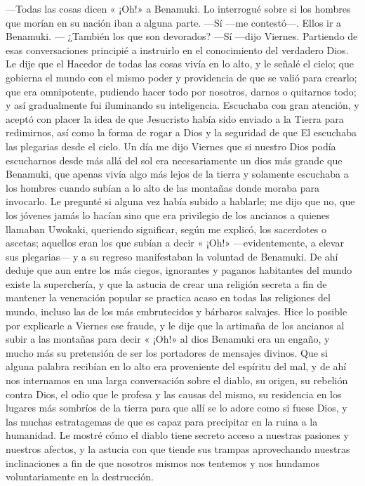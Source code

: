 \documentclass{novela}
\begin{document}
    —Todas las cosas dicen « ¡Oh!» a Benamuki.
    Lo interrogué sobre si los hombres que morían en su nación iban a alguna parte.
    —Sí —me contestó—. Ellos ir a Benamuki.
    — ¿También los que son devorados?
    —Sí —dijo Viernes.
    Partiendo de esas conversaciones principié a instruirlo en el conocimiento del verdadero Dios. Le dije que el Hacedor de todas las cosas vivía en lo alto, y le señalé el cielo; que gobierna el mundo con el mismo poder y providencia de que se valió para crearlo; que era omnipotente, pudiendo hacer todo por nosotros, darnos o quitarnos todo; y así gradualmente fui iluminando su inteligencia. Escuchaba con gran atención, y aceptó con placer la idea de que Jesucristo había sido enviado a la Tierra para redimirnos, así como la forma de rogar a Dios y la seguridad de que El escuchaba las plegarias desde el cielo. Un día me dijo Viernes que si nuestro Dios podía escucharnos desde más allá del sol era necesariamente un dios más grande que Benamuki, que apenas vivía algo más lejos de la tierra y solamente escuchaba a los hombres cuando subían a lo alto de las montañas donde moraba para invocarlo. Le pregunté si alguna vez había subido a hablarle; me dijo que no, que los jóvenes jamás lo hacían sino que era privilegio de los ancianos a quienes llamaban Uwokaki, queriendo significar, según me explicó, los sacerdotes o ascetas; aquellos eran los que subían a decir « ¡Oh!» —evidentemente, a elevar sus plegarias— y a su regreso manifestaban la voluntad de Benamuki. De ahí deduje que aun entre los más ciegos, ignorantes y paganos habitantes del mundo existe la superchería, y que la astucia de crear una religión secreta a fin de mantener la veneración popular se practica acaso en todas las religiones del mundo, incluso las de los más embrutecidos y bárbaros salvajes.
    Hice lo posible por explicarle a Viernes ese fraude, y le dije que la artimaña de los ancianos al subir a las montañas para decir « ¡Oh!» al dios Benamuki era un engaño, y mucho más su pretensión de ser los portadores de mensajes divinos. Que si alguna palabra recibían en lo alto era proveniente del espíritu del mal, y de ahí nos internamos en una larga conversación sobre el diablo, su origen, su rebelión contra Dios, el odio que le profesa y las causas del mismo, su residencia en los lugares más sombríos de la tierra para que allí se lo adore como si fuese Dios, y las muchas estratagemas de que es capaz para precipitar en la ruina a la humanidad.
    Le mostré cómo el diablo tiene secreto acceso a nuestras pasiones y nuestros afectos, y la astucia con que tiende sus trampas aprovechando nuestras inclinaciones a fin de que nosotros mismos nos tentemos y nos hundamos voluntariamente en la destrucción.
\end{document}
